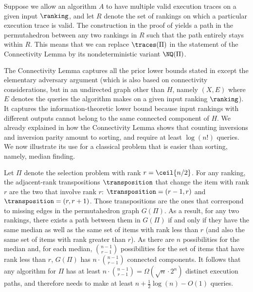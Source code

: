 \documentclass{toc}
\begin{document}
\begin{remark}\label{remark:connectivity}
Suppose we allow an algorithm $A$ to have multiple valid execution traces on a given input $\ranking$, and let $R$ denote the set of rankings on which a particular execution trace is valid. The construction in the proof of  yields a path in the permutahedron between any two rankings in $R$ such that the path entirely stays within $R$. This means that we can replace $\traces(\Pi)$ in the statement of the Connectivity Lemma by its nondeterministic variant $\NQ(\Pi)$.
\end{remark}

The Connectivity Lemma captures all the prior lower bounds stated in  except the elementary adversary argument (which is also based on connectivity considerations, but in an undirected graph other than $H$, namely $(X,E)$ where $E$ denotes the queries the algorithm makes on a given input ranking $\ranking$). It captures the
%
information-theoretic lower bound because input rankings with different outputs cannot belong to the same connected component of $H$. We already explained in  how the Connectivity Lemma shows that counting inversions and inversion parity amount to sorting, and require at least $\log(n!)$ queries. We now illustrate its use for a classical problem that is easier than sorting, 
%
namely, median finding.  %

Let $\Pi$ denote the selection problem with rank $r = \ceil{n/2}$. For any ranking, the adjacent-rank transpositions $\transposition$ that change the item with rank $r$ are the two that involve rank $r$: $\transposition = (r-1,r)$ and $\transposition = (r,r+1)$. Those transpositions are the ones that correspond to missing edges in the permutahedron graph $G(\Pi)$. As a result, for any two rankings, there exists a path between them in $G(\Pi)$ if and only if they have the same median as well as the same set of items with rank less than $r$ (and also the same set of items with rank greater than $r$). As there are $n$ possibilities for the median and, for each median, $\binom{n-1}{r-1}$ possibilities for the set of items that have rank less than $r$, $G(\Pi)$ has $n \cdot \binom{n-1}{r-1}$ connected components. It follows that any algorithm for $\Pi$ has at least $n \cdot \binom{n-1}{r-1} = \Omega(\sqrt{n}\cdot 2^n)$ distinct execution paths, and therefore needs to make at least $n + \frac{1}{2} \log(n) - O(1)$ queries. 
\end{document}

